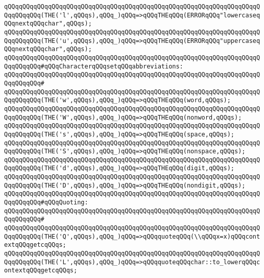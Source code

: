 \verb|qQQqqQQqqQQqqQQqqQQqqQQqqQQqqQQqqQQqqQQqqQQqqQQqqQQqqQQqqQQqqQQqqQQqqQQqqQQqqQQq(THE('l',qQQqs),qQQq_)qQQq=>qQQqTHEqQQq(ERRORqQQq"lowercaseqQQqnextqQQqchar",qQQqs);|\newline
\verb|qQQqqQQqqQQqqQQqqQQqqQQqqQQqqQQqqQQqqQQqqQQqqQQqqQQqqQQqqQQqqQQqqQQqqQQqqQQqqQQq(THE('u',qQQqs),qQQq_)qQQq=>qQQqTHEqQQq(ERRORqQQq"uppercaseqQQqnextqQQqchar",qQQqs);|\newline
\newline
\verb|qQQqqQQqqQQqqQQqqQQqqQQqqQQqqQQqqQQqqQQqqQQqqQQqqQQqqQQqqQQqqQQqqQQqqQQqqQQqqQQq#qQQqCharacterqQQqsetqQQqabbreviations:|\newline
\verb|qQQqqQQqqQQqqQQqqQQqqQQqqQQqqQQqqQQqqQQqqQQqqQQqqQQqqQQqqQQqqQQqqQQqqQQqqQQqqQQq#|\newline
\verb|qQQqqQQqqQQqqQQqqQQqqQQqqQQqqQQqqQQqqQQqqQQqqQQqqQQqqQQqqQQqqQQqqQQqqQQqqQQqqQQq(THE('w',qQQqs),qQQq_)qQQq=>qQQqTHEqQQq(word,qQQqs);|\newline
\verb|qQQqqQQqqQQqqQQqqQQqqQQqqQQqqQQqqQQqqQQqqQQqqQQqqQQqqQQqqQQqqQQqqQQqqQQqqQQqqQQq(THE('W',qQQqs),qQQq_)qQQq=>qQQqTHEqQQq(nonword,qQQqs);|\newline
\verb|qQQqqQQqqQQqqQQqqQQqqQQqqQQqqQQqqQQqqQQqqQQqqQQqqQQqqQQqqQQqqQQqqQQqqQQqqQQqqQQq(THE('s',qQQqs),qQQq_)qQQq=>qQQqTHEqQQq(space,qQQqs);|\newline
\verb|qQQqqQQqqQQqqQQqqQQqqQQqqQQqqQQqqQQqqQQqqQQqqQQqqQQqqQQqqQQqqQQqqQQqqQQqqQQqqQQq(THE('S',qQQqs),qQQq_)qQQq=>qQQqTHEqQQq(nonspace,qQQqs);|\newline
\verb|qQQqqQQqqQQqqQQqqQQqqQQqqQQqqQQqqQQqqQQqqQQqqQQqqQQqqQQqqQQqqQQqqQQqqQQqqQQqqQQq(THE('d',qQQqs),qQQq_)qQQq=>qQQqTHEqQQq(digit,qQQqs);|\newline
\verb|qQQqqQQqqQQqqQQqqQQqqQQqqQQqqQQqqQQqqQQqqQQqqQQqqQQqqQQqqQQqqQQqqQQqqQQqqQQqqQQq(THE('D',qQQqs),qQQq_)qQQq=>qQQqTHEqQQq(nondigit,qQQqs);|\newline
\newline
\verb|qQQqqQQqqQQqqQQqqQQqqQQqqQQqqQQqqQQqqQQqqQQqqQQqqQQqqQQqqQQqqQQqqQQqqQQqqQQqqQQq#qQQqQuoting:|\newline
\verb|qQQqqQQqqQQqqQQqqQQqqQQqqQQqqQQqqQQqqQQqqQQqqQQqqQQqqQQqqQQqqQQqqQQqqQQqqQQqqQQq#|\newline
\verb|qQQqqQQqqQQqqQQqqQQqqQQqqQQqqQQqqQQqqQQqqQQqqQQqqQQqqQQqqQQqqQQqqQQqqQQqqQQqqQQq(THE('Q',qQQqs),qQQq_)qQQq=>qQQqquoteqQQq(\\qQQqx=x)qQQqcontextqQQqgetcqQQqs;|\newline
\verb|qQQqqQQqqQQqqQQqqQQqqQQqqQQqqQQqqQQqqQQqqQQqqQQqqQQqqQQqqQQqqQQqqQQqqQQqqQQqqQQq(THE('L',qQQqs),qQQq_)qQQq=>qQQqquoteqQQqchar::to_lowerqQQqcontextqQQqgetcqQQqs;|\newline
